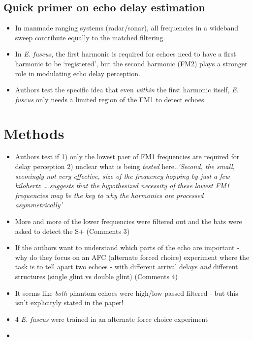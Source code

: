 \documentclass[
]{book}
\providecommand{\tightlist}{%
  \setlength{\itemsep}{0pt}\setlength{\parskip}{0pt}}
\begin{document}
\hypertarget{quick-primer-on-echo-delay-estimation}{%
\subsection{Quick primer on echo delay estimation}\label{quick-primer-on-echo-delay-estimation}}

\begin{itemize}
\tightlist
\item
  In manmade ranging systems (radar/sonar), all frequencies in a wideband sweep contribute equally to the matched filtering.
\item
  In \emph{E. fuscus}, the first harmonic is required for echoes need to have a first harmonic to be `registered', but the second harmonic (FM2) plays a stronger role in modulating echo delay perception.
\item
  Authors test the specific idea that even \emph{within} the first harmonic itself, \emph{E. fuscus} only needs a limited region of the FM1 to detect echoes.
\end{itemize}

\hypertarget{methods-9}{%
\section{Methods}\label{methods-9}}

\begin{itemize}
\tightlist
\item
  Authors test if 1) only the lowest paer of FM1 frequencies are required for delay perception 2) unclear what is being \emph{tested} here..\emph{`Second, the small, seemingly not very effective, size of the frequency hopping by just a few kilohertz \ldots.suggests that the hypothesized necessity of these lowest FM1 frequencies may be the key to why the harmonics are processed asymmetrically'}
\item
  More and more of the lower frequencies were filtered out and the bats were asked to detect the S+ (\protect\hypertarget{com_ming}{}{Comments 3})
\item
  If the authors want to understand which parts of the echo are important - why do they focus on an AFC (alternate forced choice) experiment where the task is to tell apart two echoes - with different arrival delays \emph{and} different structures (single glint vs double glint) (\protect\hypertarget{com_ming}{}{Comments 4})
\item
  It seems like \emph{both} phantom echoes were high/low passed filtered - but this isn't explicityly stated in the paper!
\item
  4 \emph{E. fuscus} were trained in an alternate force choice experiment
\item
\end{itemize}
\end{document}
